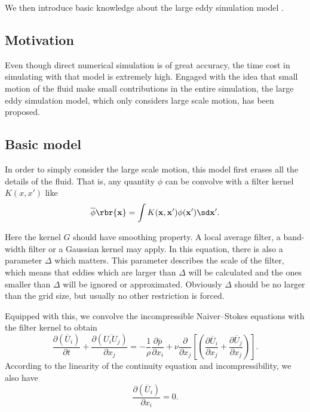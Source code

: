 \documentclass[english, nochinese]{pkupaper}
\begin{document}
We then introduce basic knowledge about the large eddy simulation model \parencite{pope_turbulent_2001} \parencite{ferziger_computational_2002}.

\subsection{Motivation}

Even though direct numerical simulation is of great accuracy, the time cost in simulating with that model is extremely high. Engaged with the idea that small motion of the fluid make small contributions in the entire simulation, the large eddy simulation model, which only considers large scale motion, has been proposed.

\subsection{Basic model}

In order to simply consider the large scale motion, this model first erases all the details of the fluid. That is, any quantity $\phi$ can be convolve with a filter kernel $K(x, x')$ like %
\begin{equation}\label{Eq:Conv}
\overline{\phi} \rbr{\mathbf{x}} = \int K(\mathbf{x}, \mathbf{x}') \phi(\mathbf{x}')\sd \mathbf{x}'.
\end{equation}

Here the kernel $G$ should have smoothing property. A local average filter, a band-width filter or a Gaussian kernel may apply. In this equation, there is also a parameter $\Delta$ which matters. This parameter describes the scale of the filter, which means that eddies which are larger than $\Delta$ will be calculated and the ones smaller than $\Delta$ will be ignored or approximated. Obviously $\Delta$ should be no larger than the grid size, but usually no other restriction is forced.

Equipped with this, we convolve the incompressible Naiver--Stokes equations with the filter kernel to obtain%
\begin{equation}\label{Eq:ConvKe}
\frac{\partial(\overline{U}_i)}{\partial t} + \frac{\partial(\overline{U_iU_j})}{\partial x_j} = -\frac{1}{\rho} \frac{\partial\overline{p}}{\partial x_i} +\nu \frac{\partial}{\partial x_j}\left[\left(\frac{\partial\overline{U}_i}{\partial x_j}+\frac{\partial\overline{U}_j}{\partial x_j}\right)\right].
\end{equation}
According to the linearity of the continuity equation and incompressibility, we also have
\begin{equation}
\frac{\partial(\overline{U}_i)}{\partial x_i} = 0.
\end{equation}
\end{document}
